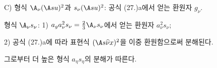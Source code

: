 
C) 형식 $\A_\nu(\A su)^2$과 $s_\nu(\A su)^2$: 공식 (27.)a에서 얻는 환원자 $g_\nu$.

형식 $\A_\nu s_\nu$: 1) $a_ga_\nu^2s_\nu=\frac23\A_\nu s_\nu$에서 얻는 환원자 $a_\nu^2s_\nu$;

2) 공식 (27.)a에 따라 표현식 $(\A s\widehat{\nu}x)^2$을 이중 환원함으로써 분해된다.

그로부터 더 높은 형식 $a_\eta s_\eta$의 분해가 따른다.
